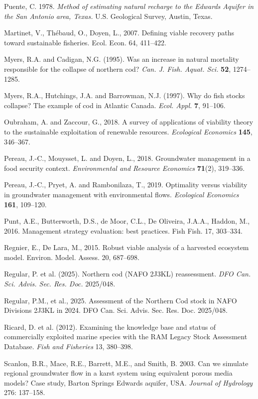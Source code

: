 Puente, C. 1978. \emph{Method of estimating natural recharge to the
Edwards Aquifer in the San Antonio area, Texas.} U.S. Geological Survey,
Austin, Texas.

Martinet, V., Th\'ebaud, O., Doyen, L., 2007. Defining viable recovery
paths toward sustainable fisheries. Ecol. Econ. 64, 411--422.

Myers, R.A. and Cadigan, N.G. (1995). Was an increase in natural mortality responsible for
the collapse of northern cod? \emph{Can. J. Fish. Aquat. Sci.} \textbf{52}, 1274--1285.

Myers, R.A., Hutchings, J.A. and Barrowman, N.J. (1997). Why do fish stocks collapse? The
example of cod in Atlantic Canada. \emph{Ecol. Appl.} \textbf{7}, 91--106.

Oubraham, A. and Zaccour, G., 2018. A survey of applications of viability theory to the
sustainable exploitation of renewable resources. \emph{Ecological Economics} \textbf{145},
346--367.

Pereau, J.-C., Mouysset, L. and Doyen, L., 2018. Groundwater management in a food security
context. \emph{Environmental and Resource Economics} \textbf{71}(2), 319--336.

Pereau, J.-C., Pryet, A. and Rambonilaza, T., 2019. Optimality versus viability in groundwater
management with environmental flows. \emph{Ecological Economics} \textbf{161}, 109--120.

Punt, A.E., Butterworth, D.S., de Moor, C.L., De Oliveira, J.A.A., Haddon, M., 2016.
Management strategy evaluation: best practices. Fish Fish. 17, 303--334.

Regnier, E., De Lara, M., 2015. Robust viable analysis of a harvested ecosystem model.
Environ. Model. Assess. 20, 687--698.

Regular, P. et al. (2025). Northern cod (NAFO 2J3KL) reassessment.
\emph{DFO Can. Sci. Advis. Sec. Res. Doc.} 2025/048.

Regular, P.M., et al., 2025. Assessment of the Northern Cod stock in
NAFO Divisions 2J3KL in 2024. DFO Can. Sci. Advis. Sec. Res. Doc.
2025/048.

Ricard, D. et al. (2012). Examining the knowledge base and status of
commercially exploited marine species with the RAM Legacy Stock
Assessment Database. \emph{Fish and Fisheries} 13, 380--398.

Scanlon, B.R., Mace, R.E., Barrett, M.E., and Smith, B. 2003. Can we
simulate regional groundwater flow in a karst system using equivalent
porous media models? Case study, Barton Springs Edwards aquifer, USA.
\emph{Journal of Hydrology} 276: 137--158.

